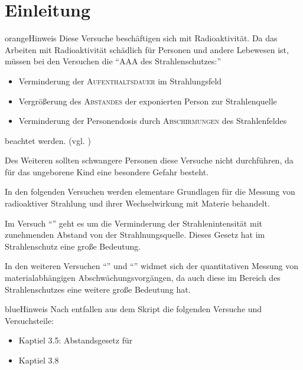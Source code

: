 \documentclass[../protokoll.tex]{subfiles}
\begin{document}
\part{Einleitung}
\begin{messageBox}{orange}{Hinweis}
Diese Versuche beschäftigen sich mit Radioaktivität. Da das Arbeiten mit
Radioaktivität schädlich für Personen und andere Lebewesen ist, müssen bei den
Versuchen die "`AAA des Strahlenschutzes:"'
\begin{itemize}
    \item Verminderung der \textsc{Aufenthaltsdauer} im Strahlungsfeld
    \item Vergrößerung des \textsc{Abstandes} der exponierten Person zur Strahlenquelle
    \item Verminderung der Personendosis durch \textsc{Abschirmungen} des Strahlenfeldes
\end{itemize}
beachtet werden. (vgl. \cite{AAA-Regel})

Des Weiteren sollten schwangere Personen diese Versuche nicht
durchführen, da für das ungeborene Kind eine besondere Gefahr besteht.
\end{messageBox}

In den folgenden Versuchen werden elementare Grundlagen für die Messung von
radioaktiver Strahlung und ihrer Wechselwirkung mit Materie behandelt.

Im Versuch "`"' geht es um die Verminderung der
Strahlenintensität mit zunehmenden Abstand von der Strahlnungsquelle. Dieses
Gesetz hat im Strahlenschutz eine große Bedeutung.

In den weiteren Versuchen "`"' und
"`"' widmet sich der quantitativen
Messung von materialabhängigen Abschwächungsvorgängen, da auch diese im Bereich
des Strahlenschutzes eine weitere große Bedeutung hat.

\begin{messageBox}{blue}{Hinweis}
    Nach \cite{listeEntfallendeVersuche} entfallen aus dem Skript die folgenden
    Versuche und Versuchsteile:
    \begin{itemize}
        \item Kaptiel 3.5: Abstandsgesetz für 
        \item Kaptiel 3.8
    \end{itemize}
\end{messageBox}
\end{document}
